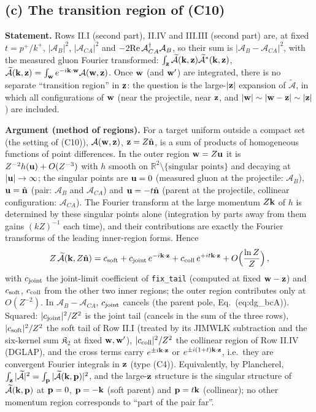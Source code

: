 \subsection{(c) The transition region of (C10)}\label{sec:r3f-c}
\noindent\textbf{Statement.} Rows II.I (second part), II.IV and III.III (second part) are, at fixed $t=p^+/k^+$, $|\mathcal A_B|^2$, $|\mathcal A_{CA}|^2$ and $-2{\rm Re}\,\mathcal A_{CA}^\dagger\mathcal A_B$, so their sum is $|\mathcal A_B-\mathcal A_{CA}|^2$, with the measured gluon Fourier transformed: $\int_{\mathbf{z}}\widetilde{\mathcal A}(\mathbf{k},\mathbf{z})\widetilde{\mathcal A}^*(\mathbf{k},\mathbf{z})$, $\widetilde{\mathcal A}(\mathbf{k},\mathbf{z})=\int_{\mathbf{w}}e^{-i\mathbf{k}\cdot\mathbf{w}}\mathcal A(\mathbf{w},\mathbf{z})$. Once $\mathbf{w}$ (and $\mathbf{w}'$) are integrated, there is no separate ``transition region'' in $\mathbf{z}$: the question is the large-$|\mathbf{z}|$ expansion of $\widetilde{\mathcal A}$, in which all configurations of $\mathbf{w}$ (near the projectile, near $\mathbf{z}$, and $|\mathbf{w}|\sim|\mathbf{w}-\mathbf{z}|\sim|\mathbf{z}|$) are included.

\noindent\textbf{Argument (method of regions).} For a target uniform outside a compact set (the setting of (C10)), $\mathcal A(\mathbf{w},\mathbf{z})$, $\mathbf{z}=Z\hat{\mathbf{n}}$, is a sum of products of homogeneous functions of point differences. In the outer region $\mathbf{w}=Z\mathbf{u}$ it is $Z^{-2}h(\mathbf{u})+O(Z^{-3})$ with $h$ smooth on $\mathbb R^2\setminus\{\text{singular points}\}$ and decaying at $|\mathbf{u}|\to\infty$; the singular points are $\mathbf{u}=0$ (measured gluon at the projectile: $\mathcal A_B$), $\mathbf{u}=\hat{\mathbf{n}}$ (pair: $\mathcal A_B$ and $\mathcal A_{CA}$) and $\mathbf{u}=-t\hat{\mathbf{n}}$ (parent at the projectile, collinear configuration: $\mathcal A_{CA}$). The Fourier transform at the large momentum $Z\mathbf{k}$ of $h$ is determined by these singular points alone (integration by parts away from them gains $(kZ)^{-1}$ each time), and their contributions are exactly the Fourier transforms of the leading inner-region forms. Hence
\begin{align}
Z\,\widetilde{\mathcal A}(\mathbf{k},Z\hat{\mathbf{n}})=c_{\rm soft}+c_{\rm joint}\,e^{-i\mathbf{k}\cdot\mathbf{z}}+c_{\rm coll}\,e^{+it\mathbf{k}\cdot\mathbf{z}}+O\Big(\frac{\ln Z}{Z}\Big)\,,
\end{align}
with $c_{\rm joint}$ the joint-limit coefficient of \texttt{fix\_tail} (computed at fixed $\mathbf{w}-\mathbf{z}$) and $c_{\rm soft}$, $c_{\rm coll}$ from the other two inner regions; the outer region contributes only at $O(Z^{-2})$. In $\mathcal A_B-\mathcal A_{CA}$, $c_{\rm joint}$ cancels (the parent pole, Eq.~(eq:dg\_bcA)). Squared: $|c_{\rm joint}|^2/Z^2$ is the joint tail (cancels in the sum of the three rows), $|c_{\rm soft}|^2/Z^2$ the soft tail of Row II.I (treated by its JIMWLK subtraction and the six-kernel sum $\mathfrak K_2$ at fixed $\mathbf{w},\mathbf{w}'$), $|c_{\rm coll}|^2/Z^2$ the collinear region of Row II.IV (DGLAP), and the cross terms carry $e^{\pm i\mathbf{k}\cdot\mathbf{z}}$ or $e^{\pm i(1+t)\mathbf{k}\cdot\mathbf{z}}$, i.e.\ they are convergent Fourier integrals in $\mathbf{z}$ (type (C4)). Equivalently, by Plancherel, $\int_{\mathbf{z}}|\widetilde{\mathcal A}|^2=\int_{\mathbf{p}}|\widetilde{\mathcal A}(\mathbf{k},\mathbf{p})|^2$, and the large-$\mathbf{z}$ structure is the singular structure of $\widetilde{\mathcal A}(\mathbf{k},\mathbf{p})$ at $\mathbf{p}=0$, $\mathbf{p}=-\mathbf{k}$ (soft parent) and $\mathbf{p}=t\mathbf{k}$ (collinear); no other momentum region corresponds to ``part of the pair far''.


